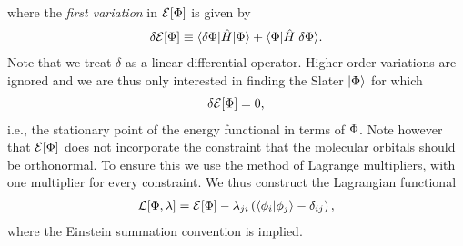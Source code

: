         where the \emph{first variation} in $\mathcal{E}[\Phi]$ is given by
        \begin{align}
            \delta\mathcal{E}[\Phi]
            \equiv
            \langle \delta\Phi |\hat{H}| \Phi \rangle + \langle \Phi |\hat{H}| \delta\Phi \rangle.
        \end{align}
        Note that we treat $\delta$ as a linear differential operator. Higher
        order variations are ignored and we are thus only interested in finding
        the Slater $| \Phi \rangle$ for which
        \begin{align}
            \delta\mathcal{E}[\Phi] = 0,
        \end{align}
        i.e., the stationary point of the energy functional in terms of $\Phi$.
        Note however that $\mathcal{E}[\Phi]$ does not incorporate the
        constraint that the molecular orbitals should be orthonormal. To ensure
        this we use the method of Lagrange multipliers, with one multiplier for
        every constraint. We thus construct the Lagrangian functional
        \begin{align}
            \mathcal{L}[\Phi, \lambda]
            = \mathcal{E}[\Phi]
            - \lambda_{ji}\left( 
                \langle \phi_i | \phi_j \rangle
                - \delta_{ij}
             \right),
        \end{align}
        where the Einstein summation convention is implied.
